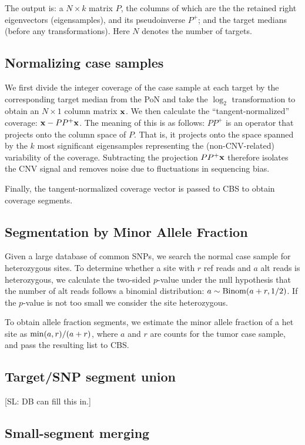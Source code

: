 \documentclass[nofootinbib,amssymb,amsmath]{revtex4}
\def\SL#1{{\color [rgb]{0,0,0.8} [SL: #1]}}
\begin{document}
The output is: a $N \times k$ matrix $P$, the columns of which are the the retained right eigenvectors (eigensamples), and its pseudoinverse $P^+$; and the target medians (before any transformations).  Here $N$ denotes the number of targets.

\subsection{Normalizing case samples}
We first divide the integer coverage of the case sample at each target by the corresponding target median from the PoN and take the $\log_2$ transformation to obtain an $N \times 1$ column matrix ${\bf x}$.  We then calculate the ``tangent-normalized'' coverage: ${\bf x} - PP^+ {\bf x}$.  The meaning of this is as follows: $PP^+$ is an operator that projects onto the column space of $P$.  That is, it projects onto the space spanned by the $k$ most significant eigensamples representing the (non-CNV-related) variability of the coverage.  Subtracting the projection $PP^+ {\bf x}$ therefore isolates the CNV signal and removes noise due to fluctuations in sequencing bias.

Finally, the tangent-normalized coverage vector is passed to CBS to obtain coverage segments.

\subsection{Segmentation by Minor Allele Fraction}
Given a large database of common SNPs, we search the normal case sample for heterozygous sites.  To determine whether a site with $r$ ref reads and $a$ alt reads is heterozygous, we calculate the two-sided $p$-value under the null hypothesis that the number of alt reads follows a binomial distribution: $a \sim {\rm Binom}(a + r, 1/2)$.  If the $p$-value is not too small we consider the site heterozygous.

To obtain allele fraction segments, we estimate the minor allele fraction of a het site as ${\rm min}(a,r)/(a + r)$, where $a$ and $r$ are counts for the tumor case sample, and pass the resulting list to CBS.

\subsection{Target/SNP segment union} \label{targetsnp-segment-union}

\SL{DB can fill this in.}

\subsection{Small-segment merging} \label{small-segment-merging}
\end{document}
